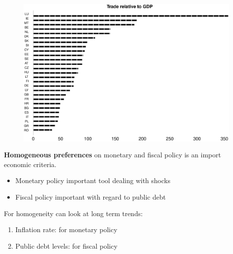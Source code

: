 \documentclass{beamer}
\begin{document}
\begin{frame}
  \begin{figure}
    \includegraphics[scale=.3]{openness.eps}
  \end{figure}
\end{frame}

\begin{frame}
  \textbf{Homogeneous preferences} on monetary and fiscal policy is an import economic criteria. 
  \begin{itemize}
    \item Monetary policy important tool dealing with shocks
    \item Fiscal policy important with regard to public debt
  \end{itemize}
  \medskip
   For homogeneity can look at long term trends:  
  \begin{enumerate}
    \item Inflation rate: for monetary policy
    \item Public debt levels: for fiscal policy
  \end{enumerate}
\end{frame}
\end{document}
